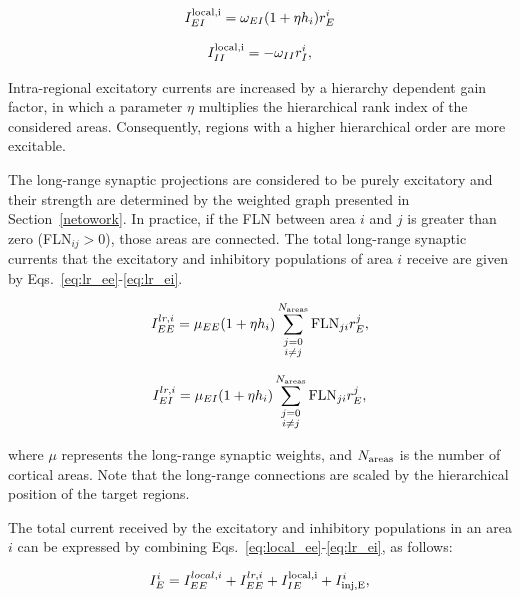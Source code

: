 \begin{equation}
        I^{\rm local,i}_{EI} = \omega_{EI}(1+\eta h_{i})r_E^{i}
        \label{eq:local_ei}
\end{equation}

\begin{equation}
        I^{\rm local,i}_{II} = -\omega_{II}r_I^{i},
        \label{eq:local_ii}
\end{equation}

\noindent Intra-regional excitatory currents are  increased by a hierarchy dependent gain factor, in which a parameter $\eta$ multiplies the hierarchical rank index of the considered areas. Consequently, regions with a higher hierarchical order are more excitable.

The long-range synaptic projections are considered to be purely excitatory and their strength are determined by the weighted graph presented in Section~\ref{netowork}. In practice, if the FLN between area $i$ and $j$ is greater than zero (FLN$_{ij} > 0$), those areas are connected. The total long-range synaptic currents that the excitatory and inhibitory populations of area $i$ receive are given by Eqs.~\ref{eq:lr_ee}-\ref{eq:lr_ei}.

\begin{equation}
    I^{lr,i}_{EE} = \mu_{EE}(1+\eta h_{i})\sum_{\substack{j = 0\\i \ne j}}^{N_{\rm areas}}\text{FLN}_{ji}r_{E}^{j},
    \label{eq:lr_ee}
\end{equation}

\begin{equation}
    I^{lr,i}_{EI} = \mu_{EI}(1+\eta h_{i})\sum_{\substack{j = 0\\i \ne j}}^{N_{\rm areas}}\text{FLN}_{ji}r_{E}^{j},
    \label{eq:lr_ei}
\end{equation}

\noindent where $\mu$  represents the long-range synaptic weights, and $N_{\rm areas}$ is the number of cortical areas. Note that the long-range connections are scaled by the hierarchical position of the target regions.

The total current received by the excitatory and inhibitory populations in an area $i$ can be expressed by combining Eqs.~\ref{eq:local_ee}-\ref{eq:lr_ei}, as follows:

\begin{equation}
    I^{i}_{E} = I_{EE}^{local,i} + I^{lr,i}_{EE} + I^{\rm local,i}_{IE} + I_{\rm inj, E}^{i},
    \label{eq:total_current_e}
\end{equation}

